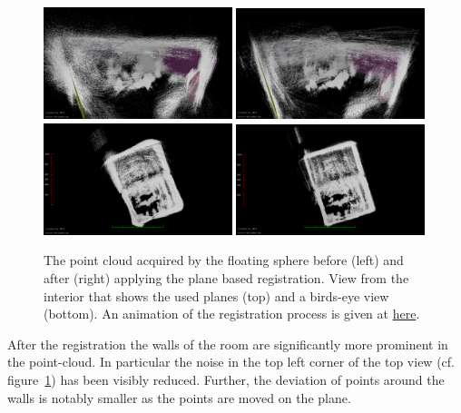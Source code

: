 \begin{figure}
	\centering
	\includegraphics[width=0.49\textwidth]{./images/cylon_uncorr_corner}\hfill
	\includegraphics[width=0.49\textwidth]{./images/cylon_corr_corner}\\
	\includegraphics[width=0.49\textwidth]{./images/cylon_uncorr_top}\hfill
	\includegraphics[width=0.49\textwidth]{./images/cylon_corr_top}
	\caption{The point cloud acquired by the floating sphere before (left) and after (right) applying the plane based registration. View from the interior that shows the used planes (top) and a birds-eye view (bottom). An animation of the registration process is given at \href{https://youtu.be/8XdIUN_9VpY}{here}.}
	\label{fig:cylon-corrected}
\end{figure}
After the registration the walls of the room are significantly more prominent in the point-cloud. 
In particular the noise in the top left corner of the top view (cf. figure~\ref{fig:cylon-corrected}) has been visibly reduced.
Further, the deviation of points around the walls is notably smaller as the points are moved on the plane.

